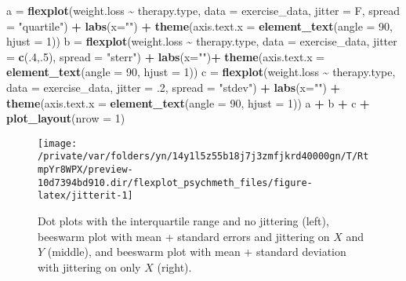 \documentclass[
  english,
  man]{apa6}
\newenvironment{Shaded}{\begin{snugshade}}{\end{snugshade}}
\newcommand{\DataTypeTok}[1]{\textcolor[rgb]{0.13,0.29,0.53}{#1}}
\newcommand{\DecValTok}[1]{\textcolor[rgb]{0.00,0.00,0.81}{#1}}
\newcommand{\FloatTok}[1]{\textcolor[rgb]{0.00,0.00,0.81}{#1}}
\newcommand{\KeywordTok}[1]{\textcolor[rgb]{0.13,0.29,0.53}{\textbf{#1}}}
\newcommand{\NormalTok}[1]{#1}
\newcommand{\OperatorTok}[1]{\textcolor[rgb]{0.81,0.36,0.00}{\textbf{#1}}}
\newcommand{\StringTok}[1]{\textcolor[rgb]{0.31,0.60,0.02}{#1}}
\begin{document}
\begin{Shaded}
\begin{Highlighting}[]
\NormalTok{a =}\StringTok{ }\KeywordTok{flexplot}\NormalTok{(weight.loss }\OperatorTok{\textasciitilde{}}\StringTok{ }\NormalTok{therapy.type, }\DataTypeTok{data =}\NormalTok{ exercise\_data, }
              \DataTypeTok{jitter =}\NormalTok{ F, }\DataTypeTok{spread =} \StringTok{"quartile"}\NormalTok{) }\OperatorTok{+}
\StringTok{              }\KeywordTok{labs}\NormalTok{(}\DataTypeTok{x=}\StringTok{""}\NormalTok{) }\OperatorTok{+}\StringTok{ }
\StringTok{              }\KeywordTok{theme}\NormalTok{(}\DataTypeTok{axis.text.x =} \KeywordTok{element\_text}\NormalTok{(}\DataTypeTok{angle =} \DecValTok{90}\NormalTok{, }\DataTypeTok{hjust =} \DecValTok{1}\NormalTok{))}
\NormalTok{b =}\StringTok{ }\KeywordTok{flexplot}\NormalTok{(weight.loss }\OperatorTok{\textasciitilde{}}\StringTok{ }\NormalTok{therapy.type, }\DataTypeTok{data =}\NormalTok{ exercise\_data, }
              \DataTypeTok{jitter =} \KeywordTok{c}\NormalTok{(.}\DecValTok{4}\NormalTok{,.}\DecValTok{5}\NormalTok{), }\DataTypeTok{spread =} \StringTok{"sterr"}\NormalTok{) }\OperatorTok{+}
\StringTok{              }\KeywordTok{labs}\NormalTok{(}\DataTypeTok{x=}\StringTok{""}\NormalTok{)}\OperatorTok{+}
\StringTok{              }\KeywordTok{theme}\NormalTok{(}\DataTypeTok{axis.text.x =} \KeywordTok{element\_text}\NormalTok{(}\DataTypeTok{angle =} \DecValTok{90}\NormalTok{, }\DataTypeTok{hjust =} \DecValTok{1}\NormalTok{))  }
\NormalTok{c =}\StringTok{ }\KeywordTok{flexplot}\NormalTok{(weight.loss }\OperatorTok{\textasciitilde{}}\StringTok{ }\NormalTok{therapy.type, }\DataTypeTok{data =}\NormalTok{ exercise\_data, }
              \DataTypeTok{jitter =} \FloatTok{.2}\NormalTok{, }\DataTypeTok{spread =} \StringTok{"stdev"}\NormalTok{) }\OperatorTok{+}\StringTok{ }
\StringTok{              }\KeywordTok{labs}\NormalTok{(}\DataTypeTok{x=}\StringTok{""}\NormalTok{) }\OperatorTok{+}\StringTok{ }
\StringTok{              }\KeywordTok{theme}\NormalTok{(}\DataTypeTok{axis.text.x =} \KeywordTok{element\_text}\NormalTok{(}\DataTypeTok{angle =} \DecValTok{90}\NormalTok{, }\DataTypeTok{hjust =} \DecValTok{1}\NormalTok{))  }
\NormalTok{a }\OperatorTok{+}\StringTok{ }\NormalTok{b }\OperatorTok{+}\StringTok{ }\NormalTok{c }\OperatorTok{+}\StringTok{ }\KeywordTok{plot\_layout}\NormalTok{(}\DataTypeTok{nrow =} \DecValTok{1}\NormalTok{)}
\end{Highlighting}
\end{Shaded}

\begin{figure}

{\centering \texttt{[image: /private/var/folders/yn/14y1l5z55b18j7j3zmfjkrd40000gn/T/RtmpYr8WPX/preview-10d7394bd910.dir/flexplot\_psychmeth\_files/figure-latex/jitterit-1]} 

}

\caption{Dot plots with the interquartile range and no jittering (left), beeswarm plot with mean + standard errors and jittering on $X$ and $Y$ (middle), and beeswarm plot with mean + standard deviation with jittering on only $X$ (right).}\label{fig:jitterit}
\end{figure}
\end{document}
